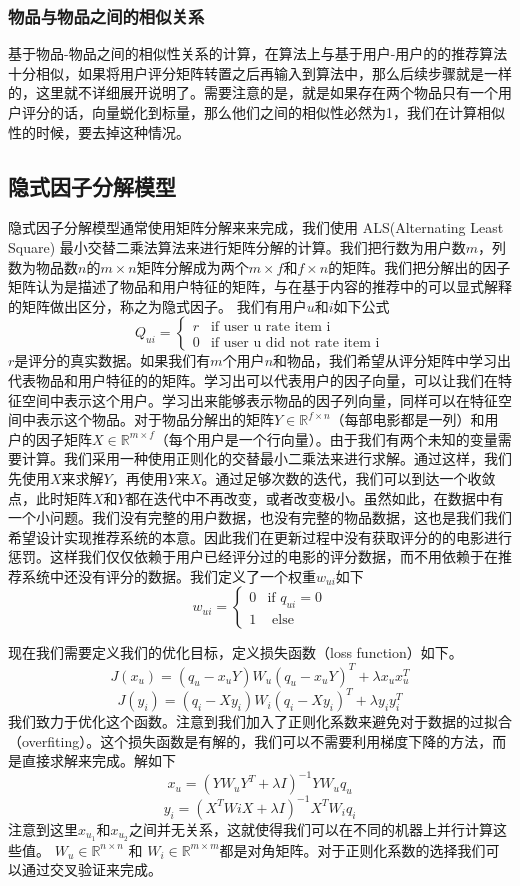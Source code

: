 \subsubsection{物品与物品之间的相似关系}
基于物品-物品之间的相似性关系的计算，在算法上与基于用户-用户的的推荐算法十分相似，如果将用户评分矩阵转置之后再输入到算法中，那么后续步骤就是一样的，这里就不详细展开说明了。需要注意的是，就是如果存在两个物品只有一个用户评分的话，向量蜕化到标量，那么他们之间的相似性必然为1，我们在计算相似性的时候，要去掉这种情况。

\subsection{隐式因子分解模型}
隐式因子分解模型通常使用矩阵分解来来完成，我们使用
ALS(Alternating Least Square) 最小交替二乘法\cite{Zachariah:2012hh}算法来进行矩阵分解的计算。我们把行数为用户数$m$，列数为物品数$n$的$m \times n$矩阵分解成为两个$m \times f$和$ f \times n$的矩阵。我们把分解出的因子矩阵认为是描述了物品和用户特征的矩阵，与在基于内容的推荐中的可以显式解释的矩阵做出区分，称之为隐式因子。
我们有用户$u$和$i$如下公式
$$
Q_{ui} = \begin{cases}
r  & \text{if user u rate item i} \\
0 & \text{if user u did not rate item i}
\end{cases}
$$
$r$是评分的真实数据。如果我们有$m$个用户$n$和物品，我们希望从评分矩阵中学习出代表物品和用户特征的的矩阵。学习出可以代表用户的因子向量，可以让我们在特征空间中表示这个用户。学习出来能够表示物品的因子列向量，同样可以在特征空间中表示这个物品。对于物品分解出的矩阵$Y \in \mathbb{R}^{f \times n}$（每部电影都是一列）和用户的因子矩阵$X \in \mathbb{R}^{m \times f}$（每个用户是一个行向量）。由于我们有两个未知的变量需要计算。我们采用一种使用正则化的交替最小二乘法来进行求解。通过这样，我们先使用$X$来求解$Y$，再使用$Y$来$X$。通过足够次数的迭代，我们可以到达一个收敛点，此时矩阵$X$和$Y$都在迭代中不再改变，或者改变极小。虽然如此，在数据中有一个小问题。我们没有完整的用户数据，也没有完整的物品数据，这也是我们我们希望设计实现推荐系统的本意。因此我们在更新过程中没有获取评分的的电影进行惩罚。这样我们仅仅依赖于用户已经评分过的电影的评分数据，而不用依赖于在推荐系统中还没有评分的数据。我们定义了一个权重$w_{ui}$如下
$$w_{ui} = \begin{cases}
0 &\text{if  } q_{ui} = 0 \\
1 & \text{ else} 
\end{cases}$$

现在我们需要定义我们的优化目标，定义损失函数（loss function）如下。
$$J(x_u) = (q_u - x_u Y) W_u (q_u - x_u Y)^T + \lambda x_u x_u^T$$
$$J(y_i) = (q_i - X y_i) W_i (q_i - X y_i)^T + \lambda y_i y_i^T$$
我们致力于优化这个函数。注意到我们加入了正则化系数来避免对于数据的过拟合（overfiting）。这个损失函数是有解的，我们可以不需要利用梯度下降的方法，而是直接求解来完成。解如下
$$x_u = (Y W_u Y^T + \lambda I)^{-1} Y W_u q_u$$
$$y_i = (X^T Wi X + \lambda I)^{-1} X^T W_i q_i$$
注意到这里$x_{u_1}$和$x_{u_2}$之间并无关系，这就使得我们可以在不同的机器上并行计算这些值。
$W_u \in \mathbb{R}^{n\times n}$ 和
$W_i \in \mathbb{R}^{m\times m}$都是对角矩阵。对于正则化系数的选择我们可以通过交叉验证来完成。

